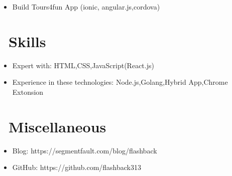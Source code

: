 \documentclass{resume}
\begin{document}
\begin{itemize}
  \item Build Tours4fun App (ionic, angular.js,cordova)
\end{itemize}


\section{\faCogs\ Skills}
\begin{itemize}[parsep=0.5ex]
  \item Expert with: HTML,CSS,JavaScript(React.js)
  \item Experience in these technologies: Node.js,Golang,Hybrid App,Chrome Extonsion
\end{itemize}

\section{\faInfo\ Miscellaneous}
\begin{itemize}[parsep=0.5ex]
  \item Blog: https://segmentfault.com/blog/flashback
  \item GitHub: https://github.com/flashback313
\end{itemize}

%
%
\end{document}
